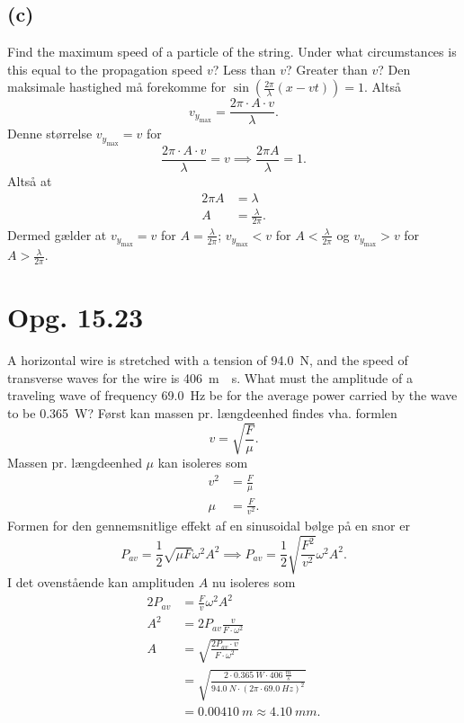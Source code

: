 \documentclass[12pt]{article}
\theoremstyle{definition}
\begin{document}
\subsection*{(c)}
Find the maximum speed of a particle of the string. Under what circumstances is this equal to the propagation speed $v$? Less than $v$? Greater than $v$?
\bigbreak
Den maksimale hastighed må forekomme for $\sin \left( \frac{2\pi}{\lambda}(x-vt) \right) = 1$. Altså
\[ 
v_{y_{\text{max}}} = \frac{2\pi \cdot A \cdot v}{\lambda}
.\]
Denne størrelse $v_{y_{\text{max}}} = v$ for
\[ 
\frac{2\pi\cdot A\cdot v}{\lambda} = v \implies \frac{2\pi A}{\lambda} = 1
.\]
Altså at
\begin{align*}
  2\pi A &= \lambda \\
  A &= \frac{\lambda}{2\pi}
.\end{align*}
Dermed gælder at $v_{y_{\text{max}}} = v$ for $A = \frac{\lambda}{2\pi}$; $v_{y_{\text{max}}} < v$ for $A < \frac{\lambda}{2\pi}$ og $v_{y_{\text{max}}} > v$ for $A > \frac{\lambda}{2\pi}$.


\section*{Opg. 15.23}
A horizontal wire is stretched with a tension of \qty{94,0}{N}, and the speed of transverse waves for the wire is \qty{406}{m \per s}. What must the amplitude of a traveling wave of frequency \qty{69,0}{Hz} be for the average power carried by the wave to be \qty{0,365}{W}?
\bigbreak
Først kan massen pr. længdeenhed findes vha. formlen
\[
v = \sqrt{\frac{F}{\mu}}
.\]
Massen pr. længdeenhed $\mu$ kan isoleres som
\begin{align*}
  v^2 &= \frac{F}{\mu} \\
  \mu &= \frac{F}{v^2}
.\end{align*}
Formen for den gennemsnitlige effekt af en sinusoidal bølge på en snor er
\[ 
P_{av} = \frac{1}{2}\sqrt{\mu F} \omega^2 A^2 \implies P_{av} = \frac{1}{2}\sqrt{\frac{F^2}{v^2}} \omega^2 A^2
.\]
I det ovenstående kan amplituden $A$ nu isoleres som
\begin{align*}
  2 P_{av} &= \frac{F}{v} \omega^2 A^2 \\
  A^2 &= 2P_{av} \frac{v}{F\cdot \omega^2} \\
  A &= \sqrt{\frac{2 P_{av}\cdot  v}{F\cdot \omega^2}} \\
  &= \sqrt{\frac{2\cdot \qty{0,365}{W} \cdot \qty{406}{\frac{m}{s}}}{\qty{94,0}{N} \cdot (2 \pi \cdot \qty{69,0}{Hz} )^2}} \\
  &= \qty{0,00410}{m} \approx \qty{4,10}{mm}  
.\end{align*}
\end{document}
